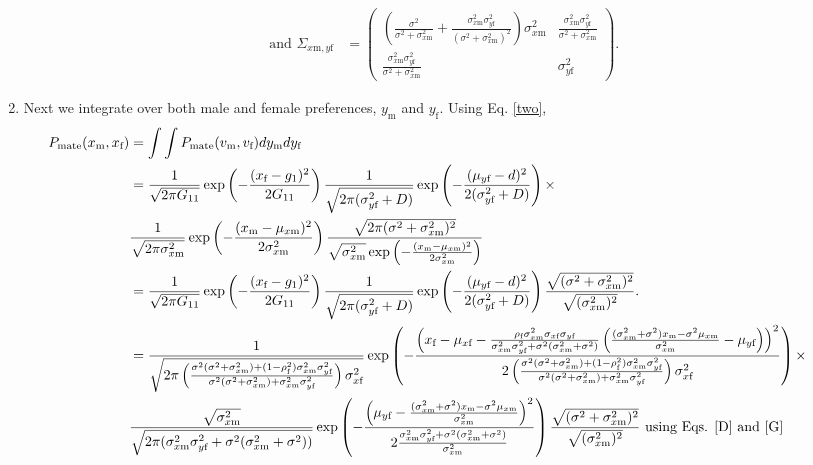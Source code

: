 \documentclass{article}
\newcommand{\x}[1]{\text{#1}}
\begin{document}
\begin{pf}
\begin{enumerate}
\begin{align*}
\\ \text{ and } \Sigma_{x\x{m},y\x{f}}&=\left(\begin{array}{cc}\left(\frac{\sigma^2}{\sigma^2+\sigma_{x\x{m}}^2}+\frac{\sigma_{x\x{m}}^2\sigma_{y\x{f}}^2}{(\sigma^2+\sigma_{x\x{m}}^2)^2}\right)\sigma_{x\x{m}}^2 & \frac{\sigma_{x\x{m}}^2\sigma_{y\x{f}}^2}{\sigma^2+\sigma_{x\x{m}}^2} \\ \frac{\sigma_{x\x{m}}^2\sigma_{y\x{f}}^2}{\sigma^2+\sigma_{x\x{m}}^2} & \sigma_{y\x{f}}^2 \end{array}\right).
\end{align*}
\item Next we integrate over both male and female preferences, $y_\x{m}$ and $y_\x{f}$. Using Eq. \ref{two},
\begin{align*}
\hspace{-20pt}P_\text{mate}(x_\x{m},x_\x{f})&=\int \int P_\text{mate}(v_\x{m},v_\x{f})dy_\x{m}dy_\x{f}
\\&=\frac{1}{\sqrt{2\pi G_{11}}}\exp\left(-\frac{(x_\x{f}-g_1)^2}{2G_{11}}\right)\frac{1}{\sqrt{2\pi(\sigma_{y\x{f}}^2+D)}}\exp\left(-\frac{(\mu_{y\x{f}}-d)^2}{2(\sigma_{y\x{f}}^2+D)}\right)\times
\\&\frac{1}{\sqrt{2\pi\sigma_{x\x{m}}^2}}\exp\left(-\frac{(x_\x{m}-\mu_{x\x{m}})^2}{2\sigma_{x\x{m}}^2}\right)\frac{\sqrt{2\pi(\sigma^2+\sigma_{x\x{m}}^2)^2}}{\sqrt{\sigma_{x\x{m}}^2}\exp\left(-\frac{(x_\x{m}-\mu_{x\x{m}})^2}{2\sigma_{x\x{m}}^2}\right)}
\\&=\frac{1}{\sqrt{2\pi G_{11}}}\exp\left(-\frac{(x_\x{f}-g_1)^2}{2G_{11}}\right)\frac{1}{\sqrt{2\pi(\sigma_{y\x{f}}^2+D)}}\exp\left(-\frac{(\mu_{y\x{f}}-d)^2}{2(\sigma_{y\x{f}}^2+D)}\right)\frac{\sqrt{(\sigma^2+\sigma_{x\x{m}}^2)^2}}{\sqrt{(\sigma_{x\x{m}}^2)^2}}.
\\&=\frac{1}{\sqrt{2\pi \left(\frac{\sigma^2(\sigma^2+\sigma_{x\x{m}}^2)+(1-\rho_\x{f}^2)\sigma_{x\x{m}}^2\sigma_{y\x{f}}^2}{\sigma^2(\sigma^2+\sigma_{x\x{m}}^2)+\sigma_{x\x{m}}^2\sigma_{y\x{f}}^2}\right)\sigma_{x\x{f}}^2}}\exp\left(-\frac{\left(x_\x{f}-\mu_{x\x{f}}-\frac{\rho_\x{f}\sigma_{x\x{m}}^2\sigma_{x\x{f}}\sigma_{y\x{f}}}{\sigma_{x\x{m}}^2\sigma_{y\x{f}}^2+\sigma^2(\sigma_{x\x{m}}^2+\sigma^2)}\left(\frac{(\sigma_{x\x{m}}^2+\sigma^2)x_\x{m}-\sigma^2\mu_{x\x{m}}}{\sigma_{x\x{m}}^2}-\mu_{y\x{f}}\right)\right)^2}{2\left(\frac{\sigma^2(\sigma^2+\sigma_{x\x{m}}^2)+(1-\rho_\x{f}^2)\sigma_{x\x{m}}^2\sigma_{y\x{f}}^2}{\sigma^2(\sigma^2+\sigma_{x\x{m}}^2)+\sigma_{x\x{m}}^2\sigma_{y\x{f}}^2}\right)\sigma_{x\x{f}}^2}\right)\times
\\&\frac{\sqrt{\sigma_{x\x{m}}^2}}{\sqrt{2\pi(\sigma_{x\x{m}}^2\sigma_{y\x{f}}^2+\sigma^2(\sigma_{x\x{m}}^2+\sigma^2))}}\exp\left(-\frac{\left(\mu_{y\x{f}}-\frac{(\sigma_{x\x{m}}^2+\sigma^2)x_\x{m}-\sigma^2\mu_{x\x{m}}}{\sigma_{x\x{m}}^2}\right)^2}{2\frac{\sigma_{x\x{m}}^2\sigma_{y\x{f}}^2+\sigma^2(\sigma_{x\x{m}}^2+\sigma^2)}{\sigma_{x\x{m}}^2}}\right)\frac{\sqrt{(\sigma^2+\sigma_{x\x{m}}^2)^2}}{\sqrt{(\sigma_{x\x{m}}^2)^2}} \text{ using Eqs. \ref{D} and \ref{G}}

\end{align*}
\end{enumerate}
\end{pf}
\end{document}
